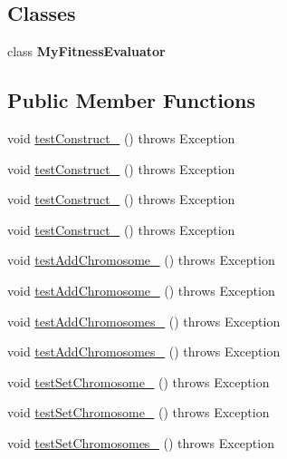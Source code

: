 \subsection*{Classes}
\begin{DoxyCompactItemize}
\item 
class {\bfseries My\-Fitness\-Evaluator}
\end{DoxyCompactItemize}
\subsection*{Public Member Functions}
\begin{DoxyCompactItemize}
\item 
void \hyperlink{classorg_1_1jgap_1_1_population_test_a49d82bdcf1495ce1036fd11e99041e98}{test\-Construct\-\_} ()  throws Exception 
\item 
void \hyperlink{classorg_1_1jgap_1_1_population_test_ad4ee58e7bca695c489219d66a7924cbc}{test\-Construct\-\_} ()  throws Exception 
\item 
void \hyperlink{classorg_1_1jgap_1_1_population_test_add700d6cfb42c1029b8370b322f8a20c}{test\-Construct\-\_} ()  throws Exception 
\item 
void \hyperlink{classorg_1_1jgap_1_1_population_test_a9c3f0fc2fc7bb82ca1b1d67eab45fed0}{test\-Construct\-\_} ()  throws Exception 
\item 
void \hyperlink{classorg_1_1jgap_1_1_population_test_a781b68bc0d8d9e7e6bbe4614b2ca4a1e}{test\-Add\-Chromosome\-\_} ()  throws Exception 
\item 
void \hyperlink{classorg_1_1jgap_1_1_population_test_a9547da86d5ed0ba64cc9c0bebf742d75}{test\-Add\-Chromosome\-\_} ()  throws Exception 
\item 
void \hyperlink{classorg_1_1jgap_1_1_population_test_a08b83de3d707c9b3ce5c04917439e563}{test\-Add\-Chromosomes\-\_} ()  throws Exception 
\item 
void \hyperlink{classorg_1_1jgap_1_1_population_test_aa926c041b4ac40369d5e74606060b707}{test\-Add\-Chromosomes\-\_} ()  throws Exception 
\item 
void \hyperlink{classorg_1_1jgap_1_1_population_test_a5958f96271d1adeb1b2351c0426bff95}{test\-Set\-Chromosome\-\_} ()  throws Exception 
\item 
void \hyperlink{classorg_1_1jgap_1_1_population_test_afab0e7965759f0fbfff5a5b81415e683}{test\-Set\-Chromosome\-\_} ()  throws Exception 
\item 
void \hyperlink{classorg_1_1jgap_1_1_population_test_a6fd2b65a07bb50aa3db3aeec267e5175}{test\-Set\-Chromosomes\-\_} ()  throws Exception 

\end{DoxyCompactItemize}
